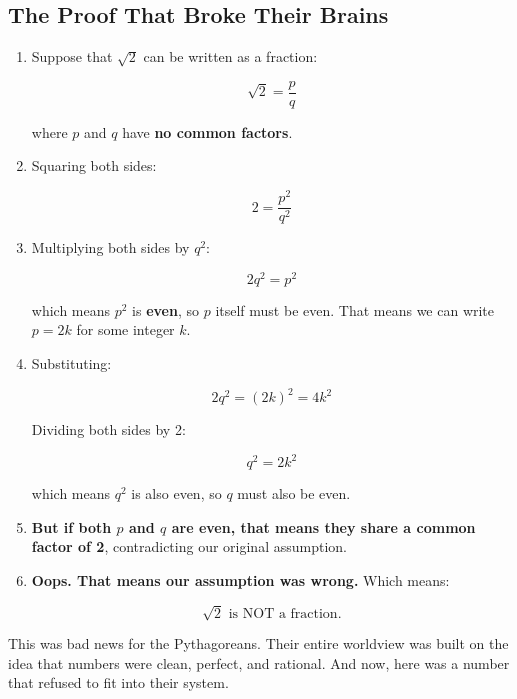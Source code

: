 \subsection{The Proof That Broke Their Brains}

\begin{enumerate}
\item Suppose that \( \sqrt{2} \) can be written as a fraction:

   \[
   \sqrt{2} = \frac{p}{q}
   \]

   where \( p \) and \( q \) have \textbf{no common factors}.

\item Squaring both sides:

   \[
   2 = \frac{p^2}{q^2}
   \]

\item Multiplying both sides by \( q^2 \):

   \[
   2q^2 = p^2
   \]

   which means \( p^2 \) is \textbf{even}, so \( p \) itself must be even. That means we can write \( p = 2k \) for some integer \( k \).

\item Substituting:

   \[
   2q^2 = (2k)^2 = 4k^2
   \]

   Dividing both sides by 2:

   \[
   q^2 = 2k^2
   \]

   which means \( q^2 \) is also even, so \( q \) must also be even.

\item \textbf{But if both \( p \) and \( q \) are even, that means they share a common factor of 2}, contradicting our original assumption.

\item \textbf{Oops. That means our assumption was wrong.} Which means:

   \[
   \sqrt{2} \text{ is NOT a fraction.}
   \]

\end{enumerate}   
   

This was bad news for the Pythagoreans. Their entire worldview was built on the idea that numbers were clean, perfect, and rational. And now, here was a number that refused to fit into their system.

